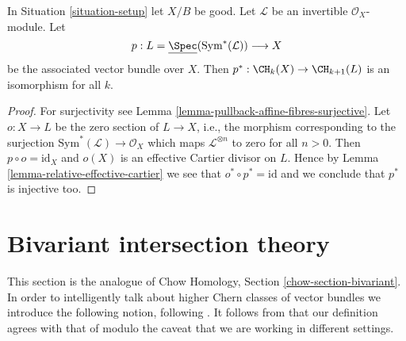 \begin{lemma}
\label{lemma-linebundle}
In Situation \ref{situation-setup} let $X/B$ be good.
Let $\mathcal{L}$ be an invertible $\mathcal{O}_X$-module.
Let
$$
p :
L = \underline{\Spec}(\text{Sym}^*(\mathcal{L}))
\longrightarrow
X
$$
be the associated vector bundle over $X$.
Then $p^* : \CH_k(X) \to \CH_{k + 1}(L)$ is an isomorphism for all $k$.
\end{lemma}

\begin{proof}
For surjectivity see Lemma \ref{lemma-pullback-affine-fibres-surjective}.
Let $o : X \to L$ be the zero section of $L \to X$, i.e., the morphism
corresponding to the surjection $\text{Sym}^*(\mathcal{L}) \to \mathcal{O}_X$
which maps $\mathcal{L}^{\otimes n}$ to zero for all $n > 0$.
Then $p \circ o = \text{id}_X$ and $o(X)$ is an effective
Cartier divisor on $L$. Hence by Lemma \ref{lemma-relative-effective-cartier}
we see that $o^* \circ p^* = \text{id}$ and we conclude that $p^*$ is
injective too.
\end{proof}























\section{Bivariant intersection theory}
\label{section-bivariant}

\noindent
This section is the analogue of
Chow Homology, Section \ref{chow-section-bivariant}.
In order to intelligently talk about higher Chern classes of vector
bundles we introduce the following notion, following \cite{FM}.
It follows from \cite[Theorem 17.1]{F} that our definition agrees
with that of \cite{F} modulo the caveat that we are working in different
settings.


